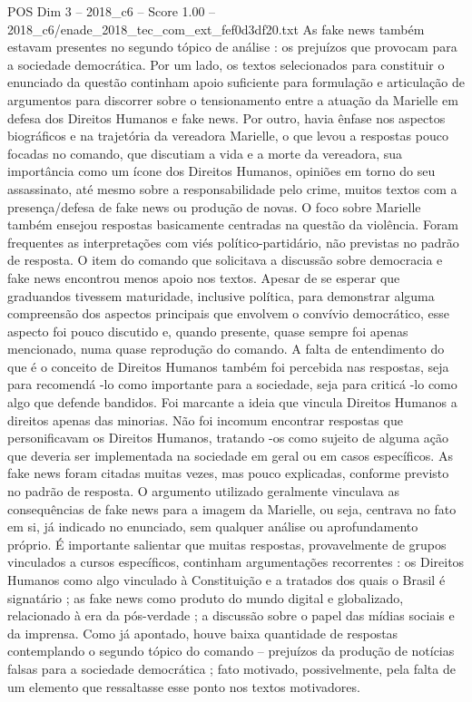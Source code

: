 \begin{textsample}{POS Dim 3 – 2018\_c6 – Score 1.00 – 2018\_c6/enade\_2018\_tec\_com\_ext\_fef0d3df20.txt}
As fake news também estavam presentes no segundo tópico de análise : os prejuízos que provocam para a sociedade democrática.
Por um lado, os textos selecionados para constituir o enunciado da questão continham apoio suficiente para formulação e articulação de argumentos para discorrer sobre o tensionamento entre a atuação da Marielle em defesa dos Direitos Humanos e fake news.
Por outro, havia ênfase nos aspectos biográficos e na trajetória da vereadora Marielle, o que levou a respostas pouco focadas no comando, que discutiam a vida e a morte da vereadora, sua importância como um ícone dos Direitos Humanos, opiniões em torno do seu assassinato, até mesmo sobre a responsabilidade pelo crime, muitos textos com a presença/defesa de fake news ou produção de novas.
O foco sobre Marielle também ensejou respostas basicamente centradas na questão da violência.
Foram frequentes as interpretações com viés político-partidário, não previstas no padrão de resposta.
O item do comando que solicitava a discussão sobre democracia e fake news encontrou menos apoio nos textos.
Apesar de se esperar que graduandos tivessem maturidade, inclusive política, para demonstrar alguma compreensão dos aspectos principais que envolvem o convívio democrático, esse aspecto foi pouco discutido e, quando presente, quase sempre foi apenas mencionado, numa quase reprodução do comando.
A falta de entendimento do que é o conceito de Direitos Humanos também foi percebida nas respostas, seja para recomendá -lo como importante para a sociedade, seja para criticá -lo como algo que defende bandidos.
Foi marcante a ideia que vincula Direitos Humanos a direitos apenas das minorias.
Não foi incomum encontrar respostas que personificavam os Direitos Humanos, tratando -os como sujeito de alguma ação que deveria ser implementada na sociedade em geral ou em casos específicos.
As fake news foram citadas muitas vezes, mas pouco explicadas, conforme previsto no padrão de resposta.
O argumento utilizado geralmente vinculava as consequências de fake news para a imagem da Marielle, ou seja, centrava no fato em si, já indicado no enunciado, sem qualquer análise ou aprofundamento próprio.
É importante salientar que muitas respostas, provavelmente de grupos vinculados a cursos específicos, continham argumentações recorrentes : os Direitos Humanos como algo vinculado à Constituição e a tratados dos quais o Brasil é signatário ; as fake news como produto do mundo digital e globalizado, relacionado à era da pós-verdade ; a discussão sobre o papel das mídias sociais e da imprensa.
Como já apontado, houve baixa quantidade de respostas contemplando o segundo tópico do comando – prejuízos da produção de notícias falsas para a sociedade democrática ; fato motivado, possivelmente, pela falta de um elemento que ressaltasse esse ponto nos textos motivadores.

\end{textsample}
